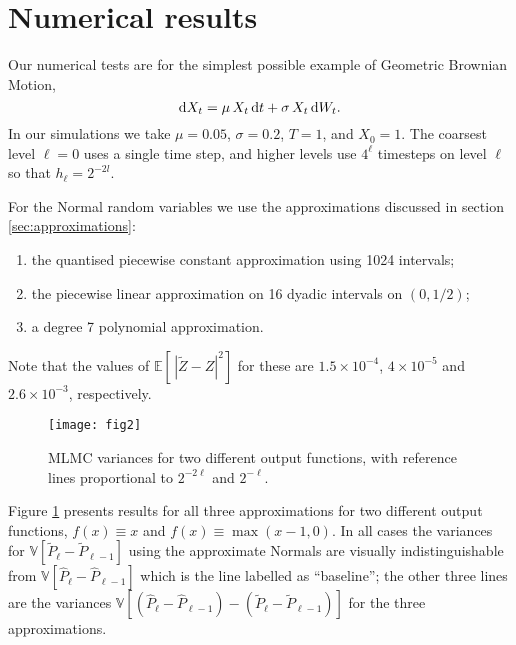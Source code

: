 \documentclass[11pt]{article}
\def \EE {{\mathbb{E}}}
\def \VV {{\mathbb{V}}}
\def \D {{\rm d}}
\def \tP {{\widetilde{P}}}
\def \tZ {{\widetilde{Z}}}
\def \hP {{\widehat{P}}}
\begin{document}
\section{Numerical results}

Our numerical tests are for the simplest possible example
of Geometric Brownian Motion,
\begin{equation*}
\label{eqt:gbm_sde}
\D X_t = \mu\, X_t\, \D t + \sigma\, X_t\, \D W_t.
\end{equation*}
In our simulations we take $\mu\!=\!0.05$, $\sigma\!=\!0.2$,
$T\!=\!1$, and $X_0\!=\!1$. The coarsest level $\ell\!=\!0$
uses a single time step, and higher levels use $4^\ell$
timesteps on level $\ell$ so that $h_\ell \!=\! 2^{-2l} $.

For the Normal random variables we use the 
approximations discussed in section \ref{sec:approximations}:
\begin{enumerate}\setlength{\itemsep}{-0.02in}
\item the quantised piecewise constant approximation using 1024 intervals;
\item the piecewise linear approximation on 16 dyadic intervals
on $(0,1/2)$;
\item a degree 7 polynomial approximation.
\end{enumerate}
Note that the values of $\EE[\, | \tZ{-}Z|^2 ]$ for these are
$1.5\!\times\!10^{-4}$, $4\!\times\!10^{-5}$ and $2.6\!\times\!10^{-3}$, respectively.

\begin{figure}[tb]
\centering
\texttt{[image: fig2]}
\caption{MLMC variances for two different output functions, with
  reference lines proportional to $2^{-2\ell}$ and $2^{-\ell}$.}
\label{fig:numeric_results}
\end{figure}

Figure \ref{fig:numeric_results} presents results for all
three approximations for two different output functions,
$f(x) {\equiv} x$ and $f(x) {\equiv} \max(x{-}1,0)$.
In all cases the variances for $\VV[\tP_\ell{-}\tP_{\ell-1}]$
using the approximate Normals are visually indistinguishable
from $\VV[\hP_\ell{-}\hP_{\ell-1}]$ which is the line labelled
as ``baseline''; the other three lines are the variances
$\VV[(\hP_\ell{-}\hP_{\ell-1}) - (\tP_\ell{-}\tP_{\ell-1})]$
for the three approximations.
\end{document}
